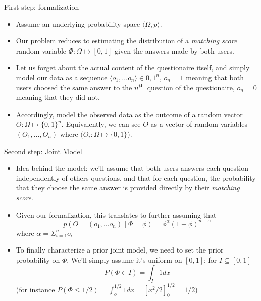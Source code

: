 \documentclass{beamer}
\begin{document}
\begin{frame}{First step: formalization}
  \begin{itemize}
  \item Assume an underlying probability space $\langle \Omega, p \rangle$.
  \item Our problem reduces to estimating the distribution of a \emph{matching score} random variable $\Phi: \Omega \mapsto [0, 1]$ given the answers made by both users.
  \item Let us forget about the actual content of the questionaire itself, and simply model our data as a sequence $\langle o_1, \dots o_n \rangle \in {0,1}^n$, $o_n = 1$ meaning that both users choosed the same answer to the $n^\textnormal{th}$ question of the questionaire, $o_n = 0$ meaning that they did not.
  \item Accordingly, model the observed data as the outcome of a random vector $O: \Omega \mapsto \{0, 1\}^n$. Equivalently, we can see $O$ as a vector of random variables $(O_1, \dots, O_n)$ where  $(O_i: \Omega \mapsto \{0,1\}$).
  \end{itemize}
    
\end{frame}

\begin{frame}{Second step: Joint Model}
  \begin{itemize}
  \item Idea behind the model: we'll assume that both users answers each question independently of others questions, and that for each question, the probability that they choose the same answer is provided directly by their \emph{matching score}.
  \item Given our formalization, this translates to further assuming that \[ p(O = (o_1, \dots o_n) \mid \Phi = \phi) = \phi^\alpha (1-\phi)^{n-\alpha} \] where $\alpha = \Sigma_{i=1}^n o_i$
  \item To finally characterize a prior joint model, we need to set the prior probability on $\Phi$. We'll simply assume it's uniform on $[0,1]$: for $I \subseteq [0,1]$ \[P(\Phi \in I) = \int_I 1 dx\]
    (for instance $P(\Phi \le 1/2) = \int_o^{1/2} 1 dx =  [x^2/2]^{1/2}_{0} = 1/2$)
  \end{itemize}
\end{frame}
\end{document}
